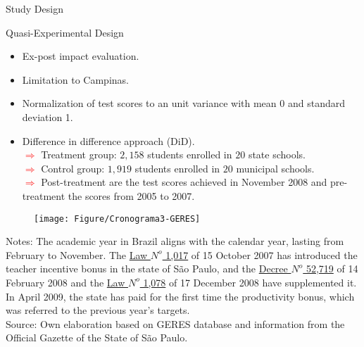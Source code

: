 \documentclass{beamer}
\begin{document}
\begin{frame} {Study Design}
\vspace{-0.22cm}
\begin{block}{\centering \Large Quasi-Experimental Design}
\begin{itemize}
\item \scriptsize Ex-post impact evaluation.
\item \scriptsize Limitation to Campinas.
\item \scriptsize Normalization of test scores to an unit variance with mean 0 and standard deviation 1.
\item \scriptsize Difference in difference approach (DiD).
\\ \tiny\textcolor{red}{$\Longrightarrow$} Treatment group: $2,158$ students enrolled in $20$ state schools.
\\ \tiny\textcolor{red}{$\Longrightarrow$} Control group: $1,919$ students enrolled in $20$ municipal schools.
\\ \tiny\textcolor{red}{$\Longrightarrow$} Post-treatment are the test scores achieved in November 2008 and pre-treatment the scores from 2005 to 2007.
\end{itemize}
\end{block} 


\begin{figure}[htb]
\vspace{-0.7cm}
\centering
\texttt{[image: Figure/Cronograma3-GERES]}
\end{figure}
     \vspace{-2.26cm}  \hspace{1pt}
\begin{minipage}{1\textwidth} 
{{\fontsize{4}{4}\selectfont  
Notes: The academic year in Brazil aligns with the calendar year, lasting from February to November. The \href{http://tiny.cc/4opsaz}{Law $N^{o}$ 1,017} of 15 October 2007 has introduced the teacher incentive bonus in the state of São Paulo, and the \href{http://tiny.cc/ympsaz}{Decree $N^{o}$ 52,719} of 14 February 2008 and the \href{http://tiny.cc/0wpsaz}{Law $N^{o}$ 1,078} of 17 December 2008 have supplemented it. In April 2009, the state has paid for the first time the productivity bonus, which was referred to the previous year's targets. \\
Source: Own elaboration based on GERES database and information from the Official Gazette of the State of São Paulo.\par}}
\end{minipage} 
\end{frame}
\end{document}

